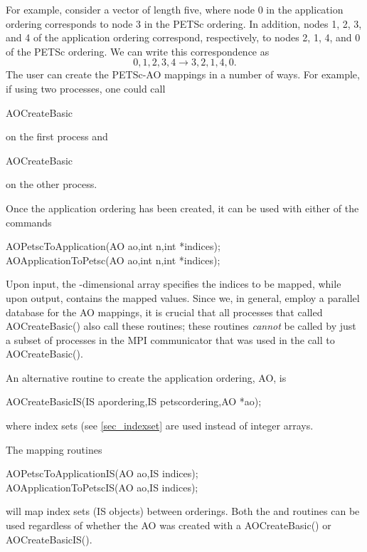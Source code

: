 For example, consider a vector of length five, where node 0 in the application ordering
corresponds to node 3 in the PETSc ordering.  In addition, nodes 1, 2, 3, and 4 of
the application ordering correspond, respectively, to nodes 2, 1, 4, and 0 of
the PETSc ordering.
We can write this correspondence as
\[
 { 0, 1, 2, 3, 4 }  \to  { 3, 2, 1, 4, 0 }. 
\]
The user can create the PETSc-AO mappings in a number of ways.  For example,
if using two processes, one could call
\begin{tabbing}
  AOCreateBasic
\end{tabbing}
on the first process and 
\begin{tabbing}
 AOCreateBasic
\end{tabbing}
on the other process.

Once the application ordering has been created, it can be used
with either of the commands
\begin{tabbing}
  AOPetscToApplication(AO ao,int n,int *indices);\\
  AOApplicationToPetsc(AO ao,int n,int *indices);
\end{tabbing}
Upon input, the -dimensional array  specifies 
the indices to be mapped, while upon output,  contains
the mapped values.
 
Since we, in general, employ a parallel database for the
AO mappings, it is crucial that all processes that
called AOCreateBasic() also call these routines; these
routines {\em cannot} be called by just a subset of processes
in the MPI communicator that was used in the call to AOCreateBasic().

An alternative routine to create the application ordering, AO, is 
\begin{tabbing}
  AOCreateBasicIS(IS apordering,IS petscordering,AO *ao);
\end{tabbing}
where index sets (see \ref{sec_indexset} are used instead of integer arrays. 

The 
mapping routines 
\begin{tabbing}
  AOPetscToApplicationIS(AO ao,IS indices);\\
  AOApplicationToPetscIS(AO ao,IS indices);
\end{tabbing}
 
will map index sets (IS objects) between orderings. Both the  and 
 routines can be used regardless of whether the AO was 
created with a AOCreateBasic() or AOCreateBasicIS().

